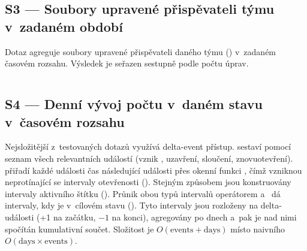 \begin{longlisting}
  \caption[S2 --- Kumulativní počet sloučených \PR]{S2 --- Kumulativní počet sloučených \PR k~zadanému datu}
  \label{lst:appendix:sql:s2:code}
  \inputminted{sql}{./code/sql/q2_merged_pr_count.sql}
\end{longlisting}

\subsection*{S3 — Soubory upravené přispěvateli týmu v~zadaném období}
\label{lst:appendix:sql:s3}

Dotaz agreguje soubory upravené přispěvateli daného týmu () v~zadaném časovém rozsahu. Výsledek je seřazen sestupně podle počtu úprav.

\begin{longlisting}
  \caption{S3 --- Soubory upravené přispěvateli týmu}
  \label{lst:appendix:sql:s3:code}
  \inputminted{sql}{./code/sql/q3_files_by_team.sql}
\end{longlisting}

\subsection*{S4 — Denní vývoj počtu \PR v~daném stavu v~časovém rozsahu}
\label{lst:appendix:sql:s4}

Nejsložitější z~testovaných dotazů využívá delta-event přístup. \CTE {} sestaví pomocí  seznam všech relevantních událostí (vznik \PR, uzavření, sloučení, znovuotevření). \CTE {} přiřadí každé události čas následující události přes okenní funkci , čímž vzniknou neprotínající se intervaly otevřenosti (). Stejným způsobem jsou konstruovány intervaly aktivního štítku (). Průnik obou typů intervalů operátorem \code{\&\&} a~\code{*} dá intervaly, kdy je \PR v~cílovém stavu (). Tyto intervaly jsou rozloženy na delta-události (+1 na začátku, $-1$ na konci), agregovány po dnech a~pak je nad nimi spočítán kumulativní součet. Složitost je $O(\text{events} + \text{days})$ místo naivního $O(\text{days} \times \text{events})$.

\begin{longlisting}
  \caption{S4 --- Denní vývoj počtu \PR v~daném stavu}
  \label{lst:appendix:sql:s4:code}
  \inputminted{sql}{./code/sql/q4_pr_state_over_time.sql}
\end{longlisting}

